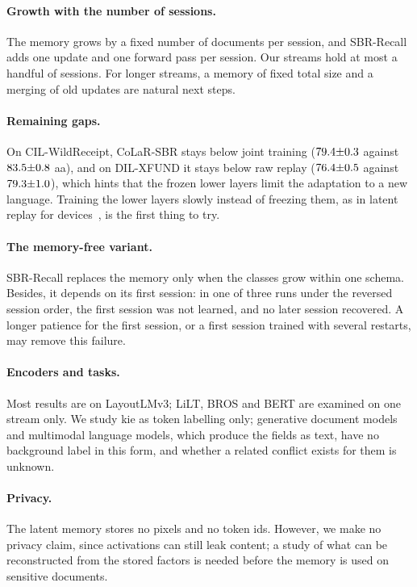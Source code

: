 \paragraph{Growth with the number of sessions.} The memory grows by a fixed number of
documents per session, and SBR-Recall adds one update and one forward pass per session.
Our streams hold at most a handful of sessions. For longer streams, a memory of fixed
total size and a merging of old updates are natural next steps.

\paragraph{Remaining gaps.} On CIL-WildReceipt, CoLaR-SBR stays below joint training
($79.4{\pm}0.3$ against $83.5{\pm}0.8$ \gls{aa}), and on DIL-XFUND it stays below raw replay
($76.4{\pm}0.5$ against $79.3{\pm}1.0$), which hints that the frozen lower layers limit the
adaptation to a new language. Training the lower layers slowly instead of freezing them,
as in latent replay for devices~\citep{pellegrini2020latent}, is the first thing to try.

\paragraph{The memory-free variant.} SBR-Recall replaces the memory only when the classes
grow within one schema. Besides, it depends on its first session: in one of three runs
under the reversed session order, the first session was not learned, and no later session
recovered. A longer patience for the first session, or a first session trained with
several restarts, may remove this failure.

\paragraph{Encoders and tasks.} Most results are on LayoutLMv3; LiLT, BROS and BERT are examined on one stream only.
We study \gls{kie} as token labelling only; generative document models and multimodal
language models, which produce the fields as text, have no background label in this form,
and whether a related conflict exists for them is unknown.

\paragraph{Privacy.} The latent memory stores no pixels and no token ids. However, we make
no privacy claim, since activations can still leak content; a study of what can be
reconstructed from the stored factors is needed before the memory is used on sensitive
documents.

